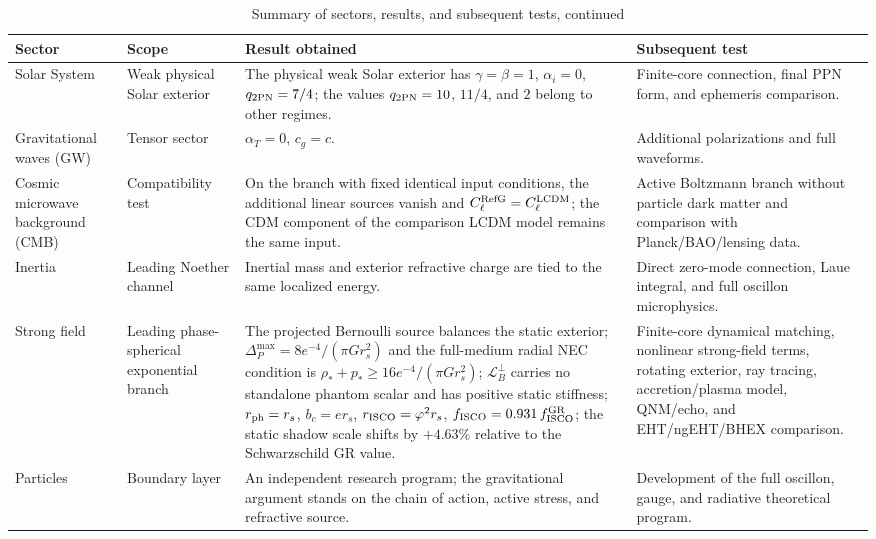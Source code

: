\documentclass[12pt]{article}
\begin{document}
\begin{table}[htbp]
\centering
\caption{Summary of sectors, results, and subsequent tests, continued}
\scriptsize
\setlength{\tabcolsep}{3pt}
\begin{tabularx}{\textwidth}{@{}>{\raggedright\arraybackslash}p{}>{\raggedright\arraybackslash}p{}XX@{}}
\toprule
Sector & Scope & Result obtained & Subsequent test \\
\midrule
Solar System & Weak physical Solar exterior &
The physical weak Solar exterior has $\gamma=\beta=1$, $\alpha_i=0$, $q_{\rm 2PN}=7/4$; the values $q_{\rm 2PN}=10$, $11/4$, and $2$ belong to other regimes. &
Finite-core connection, final PPN form, and ephemeris comparison. \\

Gravitational waves (GW) & Tensor sector &
$\alpha_T=0$, $c_g=c$. &
Additional polarizations and full waveforms. \\

Cosmic microwave background (CMB) & Compatibility test &
On the branch with fixed identical input conditions, the additional linear sources vanish and $C_\ell^{\rm RefG}=C_\ell^{\rm LCDM}$; the CDM component of the comparison LCDM model remains the same input. &
Active Boltzmann branch without particle dark matter and comparison with Planck/BAO/lensing data. \\

Inertia & Leading Noether channel &
Inertial mass and exterior refractive charge are tied to the same localized energy. &
Direct zero-mode connection, Laue integral, and full oscillon microphysics. \\

Strong field & Leading phase-spherical exponential branch &
The projected Bernoulli source balances the static exterior; $\Delta_P^{\max}=8e^{-4}/(\pi G r_s^2)$ and the full-medium radial NEC condition is $\rho_\ast+p_\ast\ge16e^{-4}/(\pi G r_s^2)$; $\mathcal L_B^\perp$ carries no standalone phantom scalar and has positive static stiffness; $r_{\rm ph}=r_s$, $b_c=e r_s$, $r_{\rm ISCO}=\varphi^2r_s$, $f_{\rm ISCO}=0.931\,f_{\rm ISCO}^{\rm GR}$; the static shadow scale shifts by $+4.63\%$ relative to the Schwarzschild GR value. &
Finite-core dynamical matching, nonlinear strong-field terms, rotating exterior, ray tracing, accretion/plasma model, QNM/echo, and EHT/ngEHT/BHEX comparison. \\

Particles & Boundary layer &
An independent research program; the gravitational argument stands on the chain of action, active stress, and refractive source. &
Development of the full oscillon, gauge, and radiative theoretical program. \\
\bottomrule
\end{tabularx}
\end{table}
\end{document}
